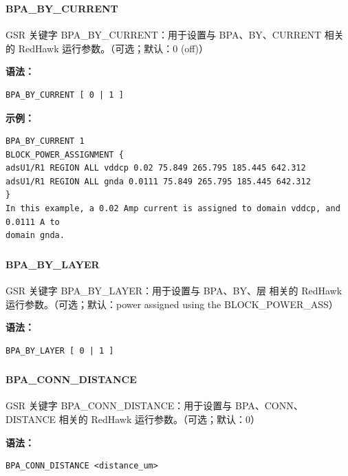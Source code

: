 \subsubsection{}
\paragraph*{BPA_BY_CURRENT}

GSR 关键字 BPA_BY_CURRENT：用于设置与 BPA、BY、CURRENT 相关的 RedHawk 运行参数。（可选；默认：0 (off)）

\textbf{语法：}
\begin{lstlisting}
BPA_BY_CURRENT [ 0 | 1 ]
\end{lstlisting}

\textbf{示例：}
\begin{lstlisting}
BPA_BY_CURRENT 1
BLOCK_POWER_ASSIGNMENT {
adsU1/R1 REGION ALL vddcp 0.02 75.849 265.795 185.445 642.312
adsU1/R1 REGION ALL gnda 0.0111 75.849 265.795 185.445 642.312
}
In this example, a 0.02 Amp current is assigned to domain vddcp, and 0.0111 A to
domain gnda.
\end{lstlisting}

\subsubsection{}
\paragraph*{BPA_BY_LAYER}

GSR 关键字 BPA_BY_LAYER：用于设置与 BPA、BY、层 相关的 RedHawk 运行参数。（可选；默认：power assigned using the BLOCK_POWER_ASS）

\textbf{语法：}
\begin{lstlisting}
BPA_BY_LAYER [ 0 | 1 ]
\end{lstlisting}

\subsubsection{}
\paragraph*{BPA_CONN_DISTANCE}

GSR 关键字 BPA_CONN_DISTANCE：用于设置与 BPA、CONN、DISTANCE 相关的 RedHawk 运行参数。（可选；默认：0）

\textbf{语法：}
\begin{lstlisting}
BPA_CONN_DISTANCE <distance_um>
\end{lstlisting}

